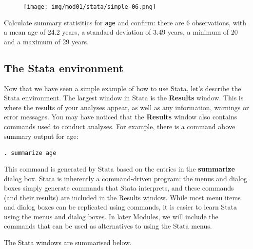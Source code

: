 \documentclass[
  a4paper,
]{memoir}
\begin{document}
\begin{figure}[H]

{\centering \texttt{[image: img/mod01/stata/simple-06.png]}

}

\end{figure}

\begin{tcolorbox}[enhanced jigsaw, title={TASK}, opacitybacktitle=0.6, colbacktitle=quarto-callout-note-color!10!white, titlerule=0mm, colframe=quarto-callout-note-color-frame, opacityback=0, left=2mm, breakable, bottomtitle=1mm, coltitle=black, bottomrule=.15mm, arc=.35mm, rightrule=.15mm, toptitle=1mm, colback=white, toprule=.15mm, leftrule=.75mm]

Calculate summary statisitics for \texttt{age} and confirm: there are 6
observations, with a mean age of 24.2 years, a standard deviation of
3.49 years, a minimum of 20 and a maximum of 29 years.

\end{tcolorbox}

\hypertarget{the-stata-environment}{%
\subsection{The Stata environment}\label{the-stata-environment}}

Now that we have seen a simple example of how to use Stata, let's
describe the Stata environment. The largest window in Stata is the
\textbf{Results} window. This is where the results of your analyses
appear, as well as any information, warnings or error messages. You may
have noticed that the \textbf{Results} window also contains commands
used to conduct analyses. For example, there is a command above summary
output for age:

\texttt{.\ summarize\ age}

This command is generated by Stata based on the entries in the
\textbf{summarize} dialog box. Stata is inherently a command-driven
program: the menus and dialog boxes simply generate commands that Stata
interprets, and these commands (and their results) are included in the
Results window. While most menu items and dialog boxes can be replicated
using commands, it is easier to learn Stata using the menus and dialog
boxes. In later Modules, we will include the commands that can be used
as alternatives to using the Stata menus.

The Stata windows are summarised below.
\end{document}
